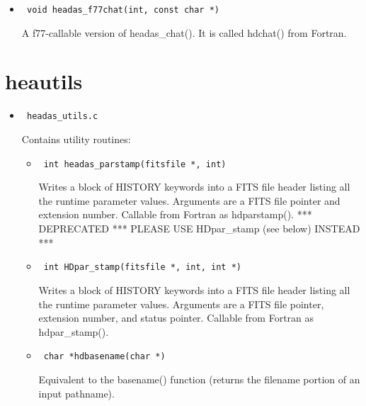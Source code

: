 \documentclass[11pt]{book}
\begin{document}
\begin{itemize}
\begin{itemize}
            \item      \begin{verbatim} void headas_f77chat(int, const char *) \end{verbatim} 
                  A f77-callable version of headas\_chat(). It
                  is called hdchat() from Fortran.
	    \end{itemize}

\end{itemize}

\section{heautils}

\begin{itemize}

\item            \begin{verbatim} headas_utils.c \end{verbatim}
            Contains utility routines:

            \begin{itemize}
            \item      \begin{verbatim} int headas_parstamp(fitsfile *, int) \end{verbatim} 
                  Writes a block of HISTORY keywords into a
                  FITS file header listing all the runtime
                  parameter values. Arguments are a FITS file
                  pointer and extension number. Callable from
                  Fortran as hdparstamp(). *** DEPRECATED *** 
                  PLEASE USE HDpar\_stamp (see below) INSTEAD ***

            \item      \begin{verbatim} int HDpar_stamp(fitsfile *, int, int *) \end{verbatim} 
                  Writes a block of HISTORY keywords into a
                  FITS file header listing all the runtime
                  parameter values. Arguments are a FITS file
                  pointer, extension number, and status pointer. 
                  Callable from Fortran as hdpar\_stamp().

            \item      \begin{verbatim} char *hdbasename(char *) \end{verbatim} 
                  Equivalent to the basename() function
                  (returns the filename portion of an input
                  pathname).


\end{itemize}
\end{itemize}
\end{document}
